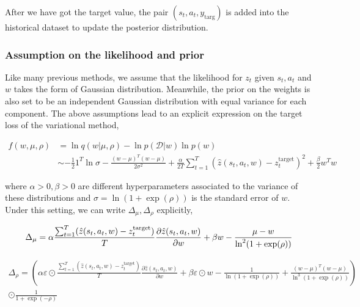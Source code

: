 \documentclass[a4paper,12pt]{article}
\begin{document}
After we have got the target value, the pair $(s_t, a_t, y_{\textrm{targ}})$ is added into the historical dataset to update the posterior distribution. 

\subsubsection{Assumption on the likelihood and prior}
Like many previous methods, we assume that the likelihood for $z_t$ given $s_t, a_t$ and $w$ takes the form of Gaussian distribution. Meanwhile, the prior on the weights is also set to be an independent Gaussian distribution with equal variance for each component. The above assumptions lead to an explicit expression on the target loss of the variational method, 

\begin{equation}
\begin{aligned}
f(w, \mu, \rho) &= \ln q(w | \mu, \rho) - \ln p(\mathcal{D}|w)\ln p(w)\\
&\sim -\frac{1}{2}1^T\ln\sigma - \frac{(w - \mu)^T(w - \mu)}{2\sigma^2}+\frac{\alpha}{2T} \sum_{t=1}^T(\hat{z}(s_t, a_t, w)-z^{\textrm{target}}_t)^2 + \frac{\beta}{2} w^Tw 
\end{aligned}
\end{equation}

where $\alpha > 0, \beta > 0$ are different hyperparameters associated to the variance of these distributions and $\sigma= \ln(1 + \exp(\rho))$ is the standard error of $w$. Under this setting, we can write $\Delta_\mu, \Delta_\rho$ explicitly, 

\begin{equation}
\Delta_\mu = \alpha\frac{\sum_{t=1}^T(\hat{z}(s_t, a_t, w)-z^{\textrm{target}}_t)}{T}\frac{\partial \hat{z}(s_t, a_t, w)}{\partial w} + \beta w - \frac{\mu - w}{\ln^2(1 + \exp(\rho))}\\
\end{equation}

\begin{equation}
\begin{split}
\Delta_\rho = \left(\alpha\varepsilon\odot\frac{\sum_{t=1}^T(\hat{z}(s_t, a_t, w)-z^{\textrm{target}}_t)}{T}\frac{\partial \hat{z}(s_t, a_t, w)}{\partial w} + \beta\varepsilon\odot w - \frac{1}{\ln(1 + \exp(\rho))} +  \frac{(w - \mu)^T(w - \mu)}{\ln^3(1 + \exp(\rho))} \right) \\
\odot\frac{1}{1 + \exp(-\rho)}
\end{split}
\end{equation}
\end{document}
